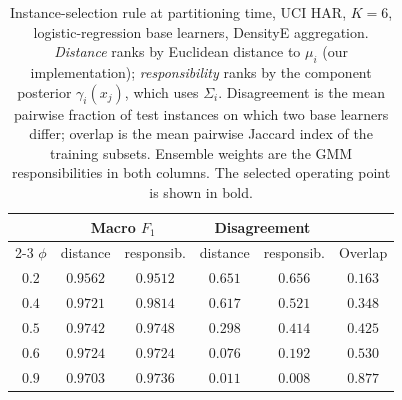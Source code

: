 \begin{table}[!t]
		\centering
		\caption{Instance-selection rule at partitioning time, UCI HAR, $K = 6$, logistic-regression
		base learners, DensityE aggregation. \emph{Distance} ranks by Euclidean distance to $\mu_i$
		(our implementation); \emph{responsibility} ranks by the component posterior
		$\gamma_i(x_j)$, which uses $\Sigma_i$. Disagreement is the mean pairwise fraction of test
		instances on which two base learners differ; overlap is the mean pairwise Jaccard index of
		the training subsets. Ensemble weights are the GMM responsibilities in both columns. The
		selected operating point is shown in bold.}
		\label{tab:selection_rule}
		\begin{tabular}{cccccc}
			\hline
			& \multicolumn{2}{c}{Macro $F_1$} & \multicolumn{2}{c}{Disagreement} & \\
			\cline{2-3}\cline{4-5}
			$\phi$ & distance & responsib. & distance & responsib. & Overlap \\
			\hline
			$0.2$ & $0.9562$ & $0.9512$ & $0.651$ & $0.656$ & $0.163$ \\
			$0.4$ & $0.9721$ & $0.9814$ & $0.617$ & $0.521$ & $0.348$ \\
			$0.5$ & $\mathbf{0.9742}$ & $0.9748$ & $0.298$ & $0.414$ & $0.425$ \\
			$0.6$ & $0.9724$ & $0.9724$ & $0.076$ & $0.192$ & $0.530$ \\
			$0.9$ & $0.9703$ & $0.9736$ & $0.011$ & $0.008$ & $0.877$ \\
			\hline
		\end{tabular}
	\end{table}
